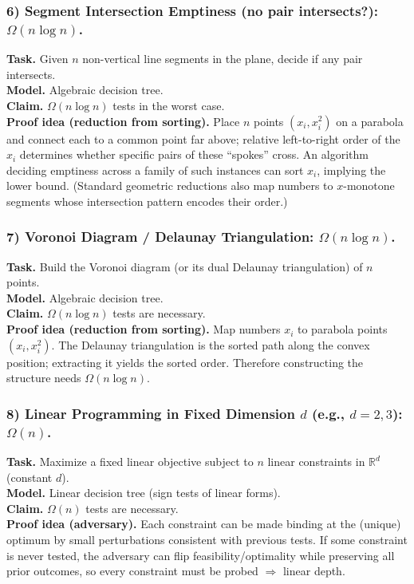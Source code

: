 \documentclass[9pt]{extarticle}
\begin{document}
\subsubsection{6) Segment Intersection Emptiness (no pair intersects?): $\Omega(n\log n)$.}
\textbf{Task.} Given $n$ non-vertical line segments in the plane, decide if any pair intersects.\\
\textbf{Model.} Algebraic decision tree.\\
\textbf{Claim.} $\Omega(n\log n)$ tests in the worst case.\\
\textbf{Proof idea (reduction from sorting).} Place $n$ points $(x_i,x_i^2)$ on a parabola and connect each to a common point far above; relative left-to-right order of the $x_i$ determines whether specific pairs of these “spokes” cross. An algorithm deciding emptiness across a family of such instances can sort $x_i$, implying the lower bound. (Standard geometric reductions also map numbers to $x$-monotone segments whose intersection pattern encodes their order.)

\subsubsection{7) Voronoi Diagram / Delaunay Triangulation: $\Omega(n\log n)$.}
\textbf{Task.} Build the Voronoi diagram (or its dual Delaunay triangulation) of $n$ points.\\
\textbf{Model.} Algebraic decision tree.\\
\textbf{Claim.} $\Omega(n\log n)$ tests are necessary.\\
\textbf{Proof idea (reduction from sorting).} Map numbers $x_i$ to parabola points $(x_i,x_i^2)$. The Delaunay triangulation is the sorted path along the convex position; extracting it yields the sorted order. Therefore constructing the structure needs $\Omega(n\log n)$.

\subsubsection{8) Linear Programming in Fixed Dimension $d$ (e.g., $d=2,3$): $\Omega(n)$.}
\textbf{Task.} Maximize a fixed linear objective subject to $n$ linear constraints in $\mathbb{R}^d$ (constant $d$).\\
\textbf{Model.} Linear decision tree (sign tests of linear forms).\\
\textbf{Claim.} $\Omega(n)$ tests are necessary.\\
\textbf{Proof idea (adversary).} Each constraint can be made binding at the (unique) optimum by small perturbations consistent with previous tests. If some constraint is never tested, the adversary can flip feasibility/optimality while preserving all prior outcomes, so every constraint must be probed $\Rightarrow$ linear depth.
\end{document}
